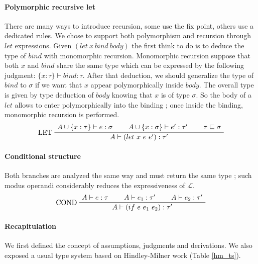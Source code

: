 \documentclass[a4paper]{report}
\newcommand{\lang}[0]{\mathcal{L}}
\newcommand{\reftab}[1]{(Table \ref{#1})}
\newcommand{\ax}[1]%
{\AxiomC{$#1$}}
\newcommand{\tric}[1]%
{\TrinaryInfC{$#1$}}
\newcommand{\drule}%
{\DisplayProof}
\begin{document}
\paragraph{Polymorphic recursive let} There are many ways to introduce recursion, some use the fix point, others use a dedicated rules. We chose to support both polymorphism and recursion through $let$ expressions. Given $(let\ x\ bind\ body)$ the first think to do is to deduce the type of $bind$ with monomorphic recursion. Monomorphic recursion suppose that both $x$ and $bind$ share the same type which can be expressed by the following judgment: $\{x:\tau\}\vdash bind:\tau$. After that deduction, we should generalize the type of $bind$ to $\sigma$ if we want that $x$ appear polymorphically inside $body$. The overall type is given by type deduction of $body$ knowing that $x$ is of type $\sigma$. So the body of a $let$ allows to enter polymorphically into the binding ; once inside the binding, monomorphic recursion is performed.
$$\ax{A\cup\{x:\tau\}\vdash e:\sigma}
\ax{A\cup\{x:\sigma\}\vdash e':\tau'}
\ax{\tau\sqsubseteq\sigma}
\LeftLabel{LET}
\tric{A\vdash (let\ x\ e\ e'):\tau'}
\drule$$

\paragraph{Conditional structure} Both branches are analyzed the same way and must return the same type ; such modus operandi considerably reduces the expressiveness of $\lang$.
$$\ax{A\vdash e:\tau}
\ax{A\vdash e_1:\tau'}
\ax{A\vdash e_2:\tau'}
\LeftLabel{COND}
\tric{A\vdash (if\ e\ e_1\ e_2):\tau'}
\drule$$

\paragraph{Recapitulation }We first defined the concept of assumptions, judgments and derivations. We also exposed a usual type system based on Hindley-Milner work \reftab{hm_ts}.
\end{document}
